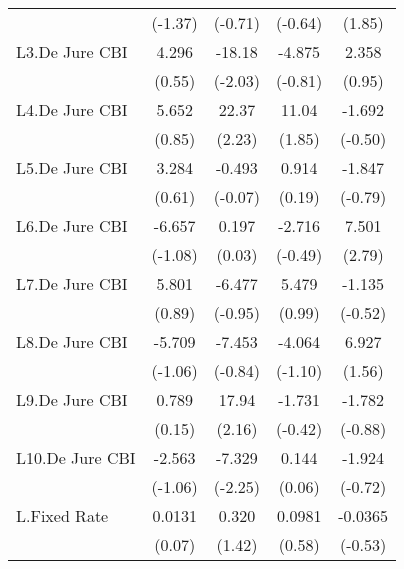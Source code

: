 {\begin{longtable}{l*{4}{c}}
                &  (-1.37)         &  (-0.71)         &  (-0.64)         &   (1.85)         \\
[1em]
L3.De Jure CBI  &    4.296         &   -18.18\sym{*}  &   -4.875         &    2.358         \\
                &   (0.55)         &  (-2.03)         &  (-0.81)         &   (0.95)         \\
[1em]
L4.De Jure CBI  &    5.652         &    22.37\sym{*}  &    11.04         &   -1.692         \\
                &   (0.85)         &   (2.23)         &   (1.85)         &  (-0.50)         \\
[1em]
L5.De Jure CBI  &    3.284         &   -0.493         &    0.914         &   -1.847         \\
                &   (0.61)         &  (-0.07)         &   (0.19)         &  (-0.79)         \\
[1em]
L6.De Jure CBI  &   -6.657         &    0.197         &   -2.716         &    7.501\sym{**} \\
                &  (-1.08)         &   (0.03)         &  (-0.49)         &   (2.79)         \\
[1em]
L7.De Jure CBI  &    5.801         &   -6.477         &    5.479         &   -1.135         \\
                &   (0.89)         &  (-0.95)         &   (0.99)         &  (-0.52)         \\
[1em]
L8.De Jure CBI  &   -5.709         &   -7.453         &   -4.064         &    6.927         \\
                &  (-1.06)         &  (-0.84)         &  (-1.10)         &   (1.56)         \\
[1em]
L9.De Jure CBI  &    0.789         &    17.94\sym{*}  &   -1.731         &   -1.782         \\
                &   (0.15)         &   (2.16)         &  (-0.42)         &  (-0.88)         \\
[1em]
L10.De Jure CBI &   -2.563         &   -7.329\sym{*}  &    0.144         &   -1.924         \\
                &  (-1.06)         &  (-2.25)         &   (0.06)         &  (-0.72)         \\
[1em]
L.Fixed Rate    &   0.0131         &    0.320         &   0.0981         &  -0.0365         \\
                &   (0.07)         &   (1.42)         &   (0.58)         &  (-0.53)         \\

\end{longtable}}
